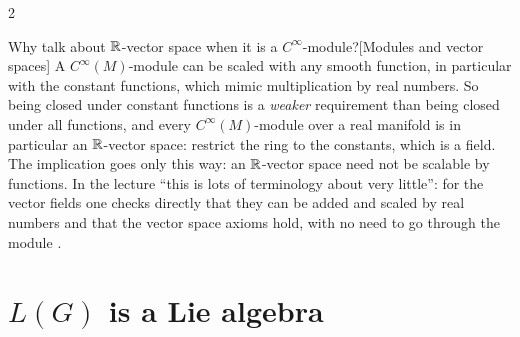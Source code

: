 \begin{paracol}{2}
\begin{answer}{Why talk about $\mathbb{R}$-vector space when it is a $C^\infty$-module?}[Modules and vector spaces]
A $C^\infty(M)$-module can be scaled with any smooth function, in particular with the constant functions, which mimic multiplication by real numbers. So being closed under constant functions is a \emph{weaker} requirement than being closed under all functions, and every $C^\infty(M)$-module over a real manifold is in particular an $\mathbb{R}$-vector space: restrict the ring to the constants, which is a field. The implication goes only this way: an $\mathbb{R}$-vector space need not be scalable by functions. In the lecture ``this is lots of terminology about very little'': for the vector fields one checks directly that they can be added and scaled by real numbers and that the vector space axioms hold, with no need to go through the module        .
\end{answer}

\section{$L(G)$ is a Lie algebra}\label{sec:ll-sub}


\end{paracol}
